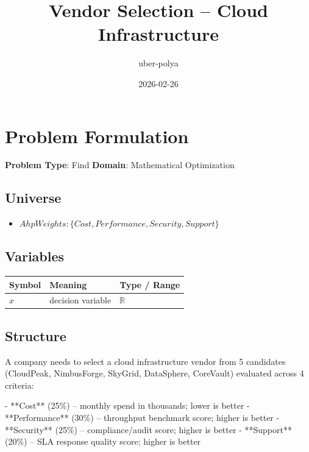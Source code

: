 \documentclass[11pt, a4paper]{article}
\title{Vendor Selection -- Cloud Infrastructure}
\author{uber-polya}
\date{2026-02-26}
\begin{document}
\maketitle
\tableofcontents
\newpage

\section{Problem Formulation}

\begin{polyamodel}

\textbf{Problem Type}: Find \hfill
\textbf{Domain}: Mathematical Optimization


\end{polyamodel}

\subsection{Universe}

\begin{itemize}
  \item $Ahp Weights: \{Cost, Performance, Security, Support\}$
\end{itemize}

\subsection{Variables}

\begin{longtable}{lll}
\toprule
\textbf{Symbol} & \textbf{Meaning} & \textbf{Type / Range} \\
\midrule
\endhead
$x$ & decision variable & $\mathbb{{R}}$ \\
\bottomrule
\end{longtable}

\subsection{Structure}

A company needs to select a cloud infrastructure vendor from 5 candidates (CloudPeak, NimbusForge, SkyGrid, DataSphere, CoreVault) evaluated across 4 criteria:

- **Cost** (25\%) -- monthly spend in thousands; lower is better
- **Performance** (30\%) -- throughput benchmark score; higher is better
- **Security** (25\%) -- compliance/audit score; higher is better
- **Support** (20\%) -- SLA response quality score; higher is better
\end{document}
